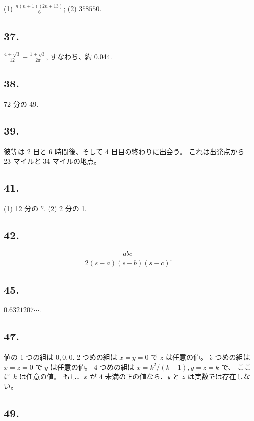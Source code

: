 (1) $ \frac{n(n+1)(2n + 13)}{6}$;
(2)
$358550$.


\subsection*{37.}

$\frac{4+\sqrt{3}}{12} - \frac{1 + \sqrt{3}}{2 \pi}$,
すなわち、約 0.044.


\subsection*{38.}

72 分の 49.

\subsection*{39.}

彼等は 2 日と 6 時間後、そして 4 日目の終わりに出会う。
これは出発点から 23 マイルと 34 マイルの地点。

\subsection*{41.}

(1) 12 分の 7. (2) 2 分の 1.


\subsection*{42.}
\[
\frac{abc}{2(s-a)(s-b)(s-c)}.
\]

\subsection*{45.}

$0.6321207 \cdots$.


\subsection*{47.}

値の 1 つの組は $0, 0, 0$.
 2 つめの組は $x = y = 0$ で $z$ は任意の値。
 3 つめの組は $x = z = 0$ で $y$ は任意の値。
4 つめの組は $x = k^2/(k-1), y = z = k$ で、
ここに $k$ は任意の値。
もし、$x$ が $4$ 未満の正の値なら、$y$ と $z$ は実数では存在しない。


\subsection*{49.}

